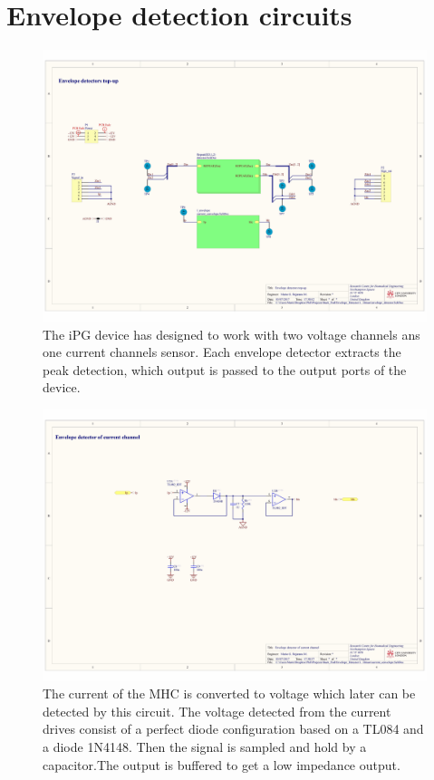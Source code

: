\section*{Envelope detection circuits}
\label{Appendix: Envelope}
\begin{figure}[!htpb]
	\centering
	\includegraphics[width=0.9\paperwidth,keepaspectratio,angle=90]{env_det_top}
	\caption[Top-up schematic of the envelope detector circuits]{The iPG device has designed to work with two voltage channels ans one current channels sensor. Each envelope detector extracts the peak detection, which output is passed to the output ports of the device.}
	\label{fig:envelope detector top}
\end{figure}

\begin{landscape}
	\begin{figure}[!htpb]
		\centering
		\includegraphics[width=0.9\paperwidth,keepaspectratio]{env_det_curr}
		\caption[Envelope detector of the current channel]{The current of the MHC is converted to voltage which later can be detected by this circuit. The voltage detected from the current drives consist of a perfect diode configuration based on a TL084 and a diode 1N4148. Then the signal is sampled and hold by a capacitor.The output is buffered to get a low impedance output.}
		\label{fig:envelope detector current}
	\end{figure}
\end{landscape}

